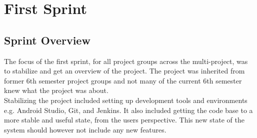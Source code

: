 \part{First Sprint}
\label{par:first_sprint}

\chapter{Sprint Overview}
The focus of the first sprint, for all project groups across the multi-project, was to stabilize and get an overview of the project. The project was inherited from former 6th semester project groups and not many of the current 6th semester knew what the \giraf project was about.
\\
Stabilizing the project included setting up development tools and environments e.g. Android Studio, Git, and Jenkins. It also included getting the code base to a more stable and useful state, from the users perspective. This new state of the system should however not include any new features.









